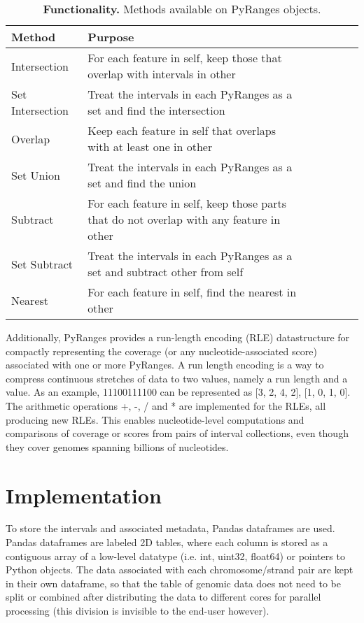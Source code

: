 \documentclass[10pt,letterpaper]{article}
\begin{document}
\begin{table}[!ht]
\begin{adjustwidth}{-1.5in}{0in}
\centering
\caption{{\bf Functionality.} Methods available on PyRanges objects.}
\begin{tabular}{|l|l|l|l|l|l|l|}
\hline
  {\bf Method} & {\bf Purpose} \\ \hline
  Intersection & For each feature in self, keep those that overlap with intervals in other \footnotemark \\ \hline
  Set Intersection & Treat the intervals in each PyRanges as a set and find the intersection \footnotemark \\ \hline
  Overlap & Keep each feature in self that overlaps with at least one in other \\ \hline
  Set Union & Treat the intervals in each PyRanges as a set and find the union \\ \hline
  Subtract & For each feature in self, keep those parts that do not overlap with any feature in other \\ \hline
  Set Subtract & Treat the intervals in each PyRanges as a set and subtract other from self \\ \hline
  Nearest & For each feature in self, find the nearest in other \\ \hline
\end{tabular}
\label{tab2}
\end{adjustwidth}
\end{table}

Additionally, PyRanges provides a run-length encoding (RLE) datastructure for
compactly representing the coverage (or any nucleotide-associated score)
associated with one or more PyRanges. A run length encoding is a way to compress
continuous stretches of data to two values, namely a run length and a value. As
an example, 11100111100 can be represented as [3, 2, 4, 2], [1, 0, 1, 0]. The
arithmetic operations +, -, / and * are implemented for the RLEs, all producing
new RLEs. This enables nucleotide-level computations and comparisons of coverage
or scores from pairs of interval collections, even though they cover genomes
spanning billions of nucleotides.

\section*{Implementation}

To store the intervals and associated metadata, Pandas dataframes are used.
Pandas dataframes are labeled 2D tables, where each column is stored as a
contiguous array of a low-level datatype (i.e. int, uint32, float64) or pointers
to Python objects. The data associated with each chromosome/strand pair are kept
in their own dataframe, so that the table of genomic data does not need to be
split or combined after distributing the data to different cores for parallel
processing (this division is invisible to the end-user however).
\end{document}
